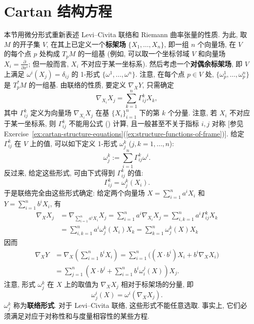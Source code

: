 \section{Cartan 结构方程}\label{sec:cartan-structure-equations}

本节用微分形式重新表述 Levi–Civita 联络和 Riemann 曲率张量的性质. 为此, 取 $M$ 的开子集 $V$, 在其上已定义一个\textbf{标架场} $\{X_1,\ldots,X_n\}$, 即一组 $n$ 个向量场, 在 $V$ 的每个点 $p$ 处构成 $T_pM$ 的一组基 (例如, 可以取一个坐标邻域 $V$ 和向量场 $X_i=\frac{\partial}{\partial x^i}$; 但一般而言, $X_i$ 不对应于某一坐标系). 然后考虑一个\textbf{对偶余标架场}, 即 $V$ 上满足 $\omega^i(X_j)=\delta_{ij}$ 的 1-形式 $\{\omega^1,\ldots,\omega^n\}$. 注意, 在每个点 $p\in V$ 处, $\{\omega_p^1,\ldots,\omega_p^n\}$ 是 $T_p^*M$ 的一组基. 由联络的性质, 要定义 $\nabla_XY$, 只需确定
\[
  \nabla_{X_i}X_j=\sum_{k=1}^n\Gamma^k_{ij}X_k,
\]
其中 $\Gamma^k_{ij}$ 定义为向量场 $\nabla_{X_i}X_j$ 在基 $\{X_i\}_{i=1}^n$ 下的第 $k$ 个分量. 注意, 若 $X_i$ 不对应于某一坐标系, 则 $\Gamma^k_{ij}$ 不能用公式 () 计算, 且一般甚至不关于指标 $i,j$ 对称 [参见 Exercise~\ref{ex:cartan-structure-equations}(\ref{ex:structure-functions-of-frame})]. 给定 $\Gamma^k_{ij}$ 在 $V$ 上的值, 可以如下定义 1-形式 $\omega^k_j$ ($j,k=1,\ldots,n$):
\begin{equation}\label{eq:connection-forms-from-christoffel-symbols}
  \omega^k_j:=\sum_{i=1}^n\Gamma^k_{ij}\omega^i.
\end{equation}
反过来, 给定这些形式, 可由下式得到 $\Gamma^k_{ij}$ 的值:
\[
  \Gamma^k_{ij}=\omega^k_j(X_i).
\]
于是联络完全由这些形式确定: 给定两个向量场 $X=\sum_{i=1}^na^iX_i$ 和 $Y=\sum_{i=1}^nb^iX_i$, 有
\begin{equation}\label{eq:covariant-derivative-of-frame-vector}
\begin{aligned}
  \nabla_XX_j&=\nabla_{\sum_{i=1}^na^iX_i}X_j
    =\sum_{i=1}^na^i\nabla_{X_i}X_j=\sum_{i,k=1}^na^i\Gamma^k_{ij}X_k\\
  &=\sum_{i,k=1}^na^i\omega^k_j(X_i)X_k=\sum_{k=1}^n\omega^k_j(X)X_k
\end{aligned}
\end{equation}
因而
\begin{equation}\label{eq:covariant-derivative-in-frame}
\begin{aligned}
  \nabla_XY&=\nabla_X\left(\sum_{i=1}^n b^iX_i\right)
  =\sum_{i=1}^n\bigl((X\cdot b^i)X_i+b^i\nabla_XX_i\bigr)\\
  &=\sum_{j=1}^n\left(X\cdot b^j+\sum_{i=1}^n b^i\omega^j_i(X)\right)X_j.
\end{aligned}
\end{equation}
注意, 形式 $\omega^k_j$ 在 $X$ 上的取值为 $\nabla_XX_j$ 相对于标架场的分量, 即
\begin{equation}\label{eq:connection-form-as-coframe-evaluation}
  \omega^i_j(X)=\omega^i(\nabla_XX_j).
\end{equation}
$\omega^k_j$ 称为\textbf{联络形式}. 对于 Levi–Civita 联络, 这些形式不能任意选取. 事实上, 它们必须满足对应于对称性和与度量相容性的某些方程.

